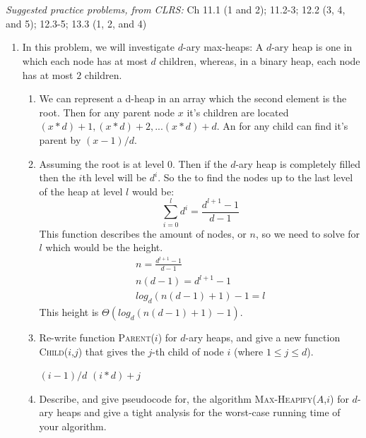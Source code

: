 \documentclass[letterpaper,11pt]{article}
\begin{document}


 \\

 \\

\emph{Suggested practice problems, from CLRS:} Ch 11.1 (1 and 2); 11.2-3; 12.2 (3, 4, and 5); 12.3-5; 13.3 (1, 2, and 4) 

\begin{enumerate}

\item In this problem, we will investigate $d$-ary max-heaps: A $d$-ary heap is one in which each node has at most $d$ children, whereas, in a binary heap, each node has at most $2$ children.

\begin{enumerate}
\item 
We can represent a d-heap in an array which the second element is the root. Then for any parent node $x$ it's children are located $(x*d)+1,(x*d)+2,...(x*d)+d$. An for any child can find it's parent by  $(x-1)/d$.

\item 
Assuming the root is at level $0$. Then if the $d$-ary heap is completely filled then the $i$th level will be $d^i$. So the to find the nodes up to the last level of the heap at level $l$ would be: \\ 
\begin{equation}
\sum_{i=0}^{l} d^i = \frac{d^{l+1}-1}{d-1} 
\end{equation}
This function describes the amount of nodes, or $n$, so we need to solve for $l$ which would be the height.
\begin{equation}
 \begin{aligned}
    n = \frac{d^{l+1}-1}{d-1} \\
    n(d-1) = d^{l+1}-1 \\
   log_d (n(d-1)+1)-1 = l           
  \end{aligned} 
\end{equation}
This height is $\Theta(log_d (n(d-1)+1)-1)$.
\item Re-write function \textsc{Parent}($i$) for $d$-ary heaps, and give a new function \textsc{Child}($i$,$j$) that gives the $j$-th child of node $i$ (where $1\leq j \leq d$).
\begin{algorithm}
\begin{algorithmic}[1]
\State \Return $(i-1)/d$
\EndFunction
{}
\State \Return $(i*d)+j$
\EndFunction
\end{algorithmic}
\end{algorithm}
\item Describe, and give pseudocode for, the algorithm \textsc{Max-Heapify}($A$,$i$) for $d$-ary heaps and give a tight analysis for the worst-case running time of your algorithm.



\end{enumerate}
\end{enumerate}
\end{document}
